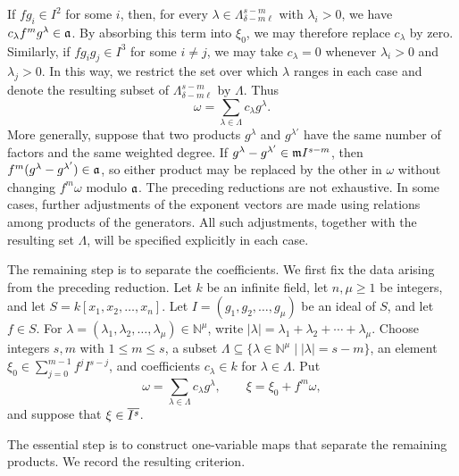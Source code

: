 If $fg_i\in I^2$ for some $i$, then, for every $\lambda\in\Lambda^{s-m}_{\delta-m\ell}$ with $\lambda_i>0$, we have $c_\lambda f^m g^\lambda\in\mathfrak{a}$.  By absorbing this term into $\xi_0$, we may therefore replace $c_\lambda$ by zero.
Similarly, if $fg_ig_j\in I^3$ for some $i\ne j$, we may take $c_\lambda=0$ whenever $\lambda_i>0$ and $\lambda_j>0$.  In this way, we restrict the set over which $\lambda$ ranges in each case and denote the resulting subset of $\Lambda^{s-m}_{\delta-m\ell}$ by $\Lambda$.  Thus
$$
\omega = \sum_{\lambda \in \Lambda} c_\lambda g^\lambda.
$$
More generally, suppose that two products $g^\lambda$ and $g^{\lambda'}$
have the same number of factors and the same weighted degree.  If
$g^\lambda-g^{\lambda'}\in\mathfrak m I^{s-m}$, then
$f^m(g^\lambda-g^{\lambda'})\in\mathfrak{a}$, so either product may be replaced by
the other in $\omega$ without changing $f^m\omega$ modulo $\mathfrak{a}$.
The preceding reductions are not exhaustive.  In some cases, further adjustments of the exponent vectors are made using relations among products of the generators.  All such adjustments, together with the resulting set $\Lambda$, will be specified explicitly in each case.


The remaining step is to separate the coefficients.  We first fix the data
arising from the preceding reduction.  Let $k$ be an infinite field, let
$n,\mu\geq1$ be integers, and let $S=k[x_1,x_2,\ldots,x_n]$.  Let
$I=(g_1,g_2,\ldots,g_\mu)$ be an ideal of $S$, and let $f\in S$.  For
$\lambda=(\lambda_1,\lambda_2,\ldots,\lambda_\mu)\in\mathbb N^\mu$, write
$|\lambda|=\lambda_1+\lambda_2+\cdots+\lambda_\mu$.
Choose integers $s,m$ with $1\leq m\leq s$, a subset
$\Lambda\subseteq\{\lambda\in\mathbb N^\mu\mid |\lambda|=s-m\}$,
an element $\xi_0\in\sum_{j=0}^{m-1}f^jI^{s-j}$, and coefficients
$c_\lambda\in k$ for $\lambda\in\Lambda$.  Put
$$
 \omega=\sum_{\lambda\in\Lambda}c_\lambda g^\lambda,
 \qquad \xi=\xi_0+f^m\omega,
$$
and suppose that $\xi\in\overline{I^s}$.

The essential step is to construct one-variable maps that separate the
remaining products.  We record the resulting criterion.

